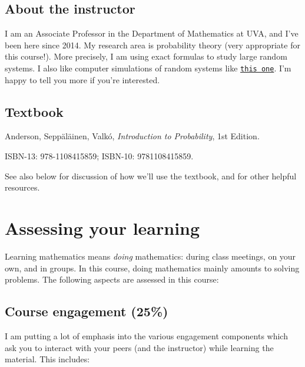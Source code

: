 \documentclass[oneside,11pt]{amsart}
\begin{document}
\subsection{About the instructor}
I am an Associate Professor in the Department of Mathematics at UVA, and I've
been here since 2014. My research area is probability theory (very appropriate
for this course!). More precisely, I am using exact formulas to study large
random systems. I also like computer simulations of random systems like 
\href{https://d3m0khvr0ybm92.cloudfront.net/img/blog/heart/UVA_colors_small.png}{\texttt{this one}}.
I'm happy to tell you more if you're
interested.


\subsection{Textbook}
\label{sub:main_textbook}

Anderson, Sepp\"al\"ainen, Valk\'o, \emph{Introduction to Probability}, 1st Edition.

ISBN-13: 978-1108415859; 
ISBN-10: 9781108415859.

See also  below for discussion 
of how we'll use the textbook,
and for other helpful resources.

\section{Assessing your learning}

Learning mathematics means \emph{doing} mathematics: during class meetings, on your own, and in groups.
In this course, doing mathematics mainly amounts to solving problems.
The following aspects are assessed in this course:

\subsection{Course engagement (25\%)}

I am putting a lot of emphasis
into the various engagement components which ask you to interact with 
your peers (and the instructor) while learning the material. This includes:
\end{document}
